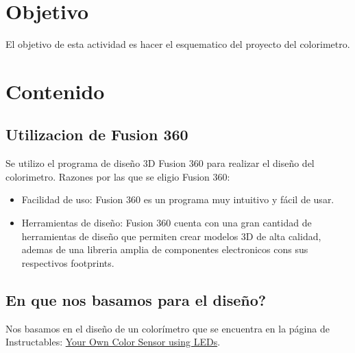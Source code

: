 \documentclass[12pt]{report}
\begin{document}
\chapter*{Objetivo}
El objetivo de esta actividad es hacer el esquematico del proyecto del colorimetro.
\newpage

\chapter{Contenido}
\section{Utilizacion de Fusion 360}
  Se utilizo el programa de diseño 3D Fusion 360 para realizar el diseño del colorimetro.
Razones por las que se eligio Fusion 360:
\begin{itemize}
  \item Facilidad de uso: Fusion 360 es un programa muy intuitivo y fácil de usar.
  \item Herramientas de diseño: Fusion 360 cuenta con una gran cantidad de herramientas de diseño que permiten crear modelos 3D de alta calidad, ademas de una libreria amplia de componentes electronicos cons sus respectivos footprints.
\end{itemize}



\section{En que nos basamos para el diseño?}
  Nos basamos en el diseño de un colorímetro que se encuentra en la página de Instructables: \href{https://www.instructables.com/Your-Own-Color-Sensor-using-LEDs/}{Your Own Color Sensor using LEDs}.
\end{document}
